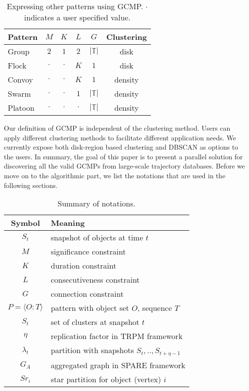 \begin{table}[h]
\caption{Expressing other patterns using GCMP. $\cdot$ indicates a user specified value.}
\label{tbl:patterns}
\centering
\begin{tabular}{|l|c|c|c|c|c|}
\hline 
\textbf{Pattern} & $M$ & $K$ & $L$ & $G$ & \textbf{Clustering} \\ 
\hline
Group & $2$ & $1$ & $2$ & $|\mathbb{T}|$ & disk\\
\hline
Flock & $\cdot$ & $\cdot$ & $K$ & $1$ & disk \\
\hline 
Convoy & $\cdot$ & $\cdot$ & $K$ & $1$ & density\\ 
\hline 
Swarm & $\cdot$ & $\cdot$ & $1$ & $|\mathbb{T}|$ & density\\ 
\hline 
Platoon & $\cdot$ & $\cdot$ & $\cdot$ & $|\mathbb{T}|$ & density\\  
\hline 
\end{tabular} 
\end{table}

Our definition of GCMP is independent of the clustering method. Users can apply different clustering methods to facilitate different application needs. 
We currently expose both disk-region based clustering and DBSCAN as options to the users. In summary, the goal of this paper is to present a parallel solution for discovering all the valid GCMPs from large-scale trajectory databases. Before we move on to the algorithmic part, we list the notations that are used in the following sections.

\begin{table}[h]
\caption{Summary of notations.}
\centering
\begin{tabular}{|c|l|} 
\hline
\textbf{Symbol} & \textbf{Meaning} \\
\hline
$S_t$ & snapshot of objects at time $t$ \\
\hline
$M$ & significance constraint \\
\hline 
$K$ & duration constraint\\
\hline
$L$ & consecutiveness constraint\\
\hline
$G$ & connection constraint \\
\hline
$P=\langle O:T \rangle$ & pattern with object set $O$, sequence $T$\\
\hline
$S_t$ & set of clusters at snapshot $t$\\
\hline
$\eta$ & replication factor in TRPM framework\\
\hline 
$\lambda_t$ & partition with snapshots $S_t,..,S_{t+\eta-1}$ \\
\hline
$G_A$ & aggregated graph in SPARE framework\\
\hline
$Sr_i $ &  star partition for object (vertex) $i$ \\
\hline 
\end{tabular} 
\end{table}